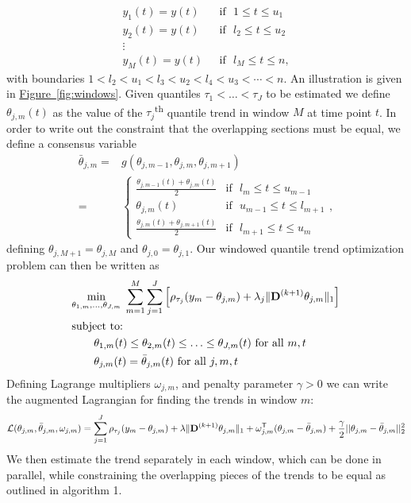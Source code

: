 \documentclass[12pt]{article}
\newcommand{\Fig}[1]{\hyperref[fig:#1]{Figure~\ref*{fig:#1}}} %
\newcommand{\Fig}[1]{{Figure~\ref{fig:#1}}} %
\newcommand{\Tra}{^{\sf T}} %
\newcommand{\M}[1]{{\bm{\mathbf{\MakeUppercase{#1}}}}} %
\newcommand{\Mn}[2]{\M{#1}^{(#2)}} %
\begin{document}
	\begin{align*}
	y_1(t) = y(t) & \mbox{~~if~~} 1 \le t \le u_{1}\\
	y_2(t) = y(t) & \mbox{~~if~~} l_{2} \le t \le u_{2} \\
	\vdots & \\
	y_M(t) = y(t) & \mbox{~~if~~} l_{M} \le t \le  n,
	\end{align*}
with boundaries $1 < l_{2} < u_{1} < l_{3} < u_{2} < l_{4} < u_{3} < \cdots< n$. An illustration is given in \Fig{windows}. Given quantiles $\tau_1 < \ldots < \tau_J$ to be estimated we define $\theta_{j,m}(t)$ as the value of the $\tau_j$\textsuperscript{th} quantile trend in window $M$ at time point $t$. In order to write out the constraint that the overlapping sections must be equal, we define a consensus variable
	 \begin{align*}
		 \bar{\theta}_{j,m} =&  g(\theta_{j, m-1}, \theta_{j,m}, \theta_{j,m+1}) \\
		 =& \begin{cases} 
			 \frac{\theta_{j,m-1}(t)+\theta_{j,m}(t)}{2} & \mbox{if~~} l_{m} \le t \le u_{m-1}  \\
			 \theta_{j,m}(t) & \mbox{if~~} u_{m-1} \le t \le l_{m+1}  \\
			 \frac{\theta_{j,m}(t)+\theta_{j,m+1}(t)}{2} & \mbox{if~~} l_{m+1} \le t \le u_{m}  
			 \end{cases},
	\end{align*}
	defining $\theta_{j,M+1} = \theta_{j,M}$ and $\theta_{j,0} = \theta_{j,1}$. Our windowed quantile trend optimization problem can then be written as 
	 \begin{align*}
		 \label{eq:quantile_windows}
		 &\underset{\theta_{1,m}, \ldots, \theta_{J,m}}{\min}\; \sum_{m=1}^M\sum_{j=1}^J \left [\rho_{\tau_j}(y_m - \theta_{j,m}) + 
		 \lambda_j \lVert \Mn{D}{k+1} \theta_{j,m} \rVert_1 \right ] \\
		 &\text{subject to: }\; \\
		 &\qquad \theta_{1,m}(t) \le \theta_{2,m}(t) \le \ldots \le \theta_{J,m}(t) \text{ for all } m,t \\
		 &\qquad \theta_{j,m}(t) = \bar{\theta}_{j,m}(t) \text{ for all } j, m, t
	 \end{align*}
	 Defining Lagrange multipliers $\omega_{j,m}$, and penalty parameter $\gamma > 0$ we can write the augmented Lagrangian for finding the trends in window $m$:
	 \begin{equation*}
	 \mathcal{L}(\theta_{j,m}, \bar{\theta}_{j,m}, \omega_{j,m}) = \sum_{j=1}^J\rho_{\tau_j}(y_m - \theta_{j,m})+\lambda \lVert \Mn{D}{k+1}\theta_{j,m}\rVert_1 +  \omega_{j,m}\Tra(\theta_{j,m} - \bar{\theta}_{j,m}) + 
	 \frac{\gamma}{2}||\theta_{j,m} - \bar{\theta}_{j,m}||_2^2
	 \end{equation*}
	 We then estimate the trend separately in each window, which can be done in parallel, while constraining the overlapping pieces of the trends to be equal as outlined in algorithm 1. 
	 
\end{document}
